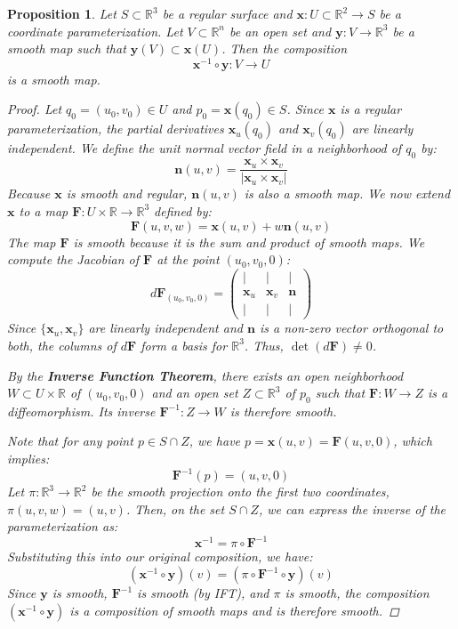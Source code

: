 \documentclass[10pt, a4paper]{article}
\theoremstyle{plain}
\newtheorem{proposition}[theorem]{Proposition}
\theoremstyle{definition}
\theoremstyle{remark}
\begin{document}
\begin{proposition}
Let $S \subset \mathbb{R}^3$ be a regular surface and $\mathbf{x}: U \subset \mathbb{R}^2 \to S$ be a coordinate parameterization. Let $V \subset \mathbb{R}^n$ be an open set and $\mathbf{y}: V \to \mathbb{R}^3$ be a smooth map such that $\mathbf{y}(V) \subset \mathbf{x}(U)$. Then the composition 
\[ \mathbf{x}^{-1} \circ \mathbf{y}: V \to U \] 
is a smooth map.

\begin{proof}
Let $q_0 = (u_0, v_0) \in U$ and $p_0 = \mathbf{x}(q_0) \in S$. Since $\mathbf{x}$ is a regular parameterization, the partial derivatives $\mathbf{x}_u(q_0)$ and $\mathbf{x}_v(q_0)$ are linearly independent. We define the unit normal vector field in a neighborhood of $q_0$ by:
\[ \mathbf{n}(u, v) = \frac{\mathbf{x}_u \times \mathbf{x}_v}{|\mathbf{x}_u \times \mathbf{x}_v|} \]
Because $\mathbf{x}$ is smooth and regular, $\mathbf{n}(u, v)$ is also a smooth map. We now extend $\mathbf{x}$ to a map $\mathbf{F}: U \times \mathbb{R} \to \mathbb{R}^3$ defined by:
\[ \mathbf{F}(u, v, w) = \mathbf{x}(u, v) + w\mathbf{n}(u, v) \]
The map $\mathbf{F}$ is smooth because it is the sum and product of smooth maps. We compute the Jacobian of $\mathbf{F}$ at the point $(u_0, v_0, 0)$:
\[ d\mathbf{F}_{(u_0, v_0, 0)} = \begin{pmatrix} | & | & | \\ \mathbf{x}_u & \mathbf{x}_v & \mathbf{n} \\ | & | & | \end{pmatrix} \]
Since $\{\mathbf{x}_u, \mathbf{x}_v\}$ are linearly independent and $\mathbf{n}$ is a non-zero vector orthogonal to both, the columns of $d\mathbf{F}$ form a basis for $\mathbb{R}^3$. Thus, $\det(d\mathbf{F}) \neq 0$.

By the \textbf{Inverse Function Theorem}, there exists an open neighborhood $W \subset U \times \mathbb{R}$ of $(u_0, v_0, 0)$ and an open set $Z \subset \mathbb{R}^3$ of $p_0$ such that $\mathbf{F}: W \to Z$ is a diffeomorphism. Its inverse $\mathbf{F}^{-1}: Z \to W$ is therefore smooth.

Note that for any point $p \in S \cap Z$, we have $p = \mathbf{x}(u, v) = \mathbf{F}(u, v, 0)$, which implies:
\[ \mathbf{F}^{-1}(p) = (u, v, 0) \]
Let $\pi: \mathbb{R}^3 \to \mathbb{R}^2$ be the smooth projection onto the first two coordinates, $\pi(u, v, w) = (u, v)$. Then, on the set $S \cap Z$, we can express the inverse of the parameterization as:
\[ \mathbf{x}^{-1} = \pi \circ \mathbf{F}^{-1} \]
Substituting this into our original composition, we have:
\[ (\mathbf{x}^{-1} \circ \mathbf{y})(v) = (\pi \circ \mathbf{F}^{-1} \circ \mathbf{y})(v) \]
Since $\mathbf{y}$ is smooth, $\mathbf{F}^{-1}$ is smooth (by IFT), and $\pi$ is smooth, the composition $(\mathbf{x}^{-1} \circ \mathbf{y})$ is a composition of smooth maps and is therefore smooth.
\end{proof}
\end{proposition}
\end{document}
